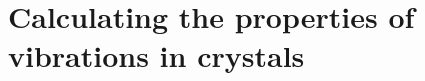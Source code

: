 \section{Calculating the properties of vibrations in crystals} \label{sec:latticedynamics}













